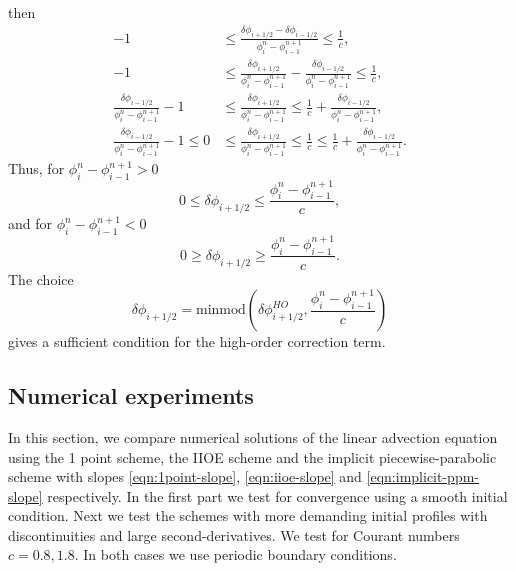 \documentclass[../thesis.tex]{subfiles}
\begin{document}
then
\begin{equation}
    \begin{split}
        -1
        &\leq
        \frac{\delta \phi_{i+1/2} - \delta \phi_{i-1/2}}
        {\phi_{i}^{n} - \phi_{i-1}^{n+1}}
        \leq
        \frac{1}{c},
        \\
        -1
        &\leq
        \frac{\delta \phi_{i+1/2}}
        {\phi_{i}^{n} - \phi_{i-1}^{n+1}}
        -\frac{\delta \phi_{i-1/2}}
        {\phi_{i}^{n} - \phi_{i-1}^{n+1}}
        \leq
        \frac{1}{c},
        \\
        \frac{\delta \phi_{i-1/2}}
        {\phi_{i}^{n} - \phi_{i-1}^{n+1}}-1
        &\leq
        \frac{\delta \phi_{i+1/2}}
        {\phi_{i}^{n} - \phi_{i-1}^{n+1}}
        \leq
        \frac{1}{c}
        +\frac{\delta \phi_{i-1/2}}
        {\phi_{i}^{n} - \phi_{i-1}^{n+1}},
        \\
        \frac{\delta \phi_{i-1/2}}
        {\phi_{i}^{n} - \phi_{i-1}^{n+1}}-1
        \leq
        0
        &\leq
        \frac{\delta \phi_{i+1/2}}
        {\phi_{i}^{n} - \phi_{i-1}^{n+1}}
        \leq
        \frac{1}{c}
        \leq
        \frac{1}{c}
        +\frac{\delta \phi_{i-1/2}}
        {\phi_{i}^{n} - \phi_{i-1}^{n+1}}.
    \end{split}
\end{equation}
Thus, for \(\phi_{i}^{n} - \phi_{i-1}^{n+1} > 0\)
\begin{equation}
    0
    \leq
    \delta \phi_{i+1/2}
    \leq
    \frac{\phi_{i}^{n} - \phi_{i-1}^{n+1}}{c},
\end{equation}
and for \(\phi_{i}^{n} - \phi_{i-1}^{n+1} < 0\)
\begin{equation}
    0
    \geq
    \delta \phi_{i+1/2}
    \geq
    \frac{\phi_{i}^{n} - \phi_{i-1}^{n+1}}{c}.
\end{equation}
The choice
\begin{equation}
    \delta \phi_{i+1/2} = \mbox{minmod}\left(
        \delta \phi_{i+1/2}^{HO},
        \frac{\phi_{i}^{n} - \phi_{i-1}^{n+1}}{c}
    \right)
\end{equation}
gives a sufficient condition for the high-order correction term.
\subsection[]{Numerical experiments}
In this section, we compare numerical solutions of the linear advection equation using the 1 point scheme, the  IIOE scheme and the implicit piecewise-parabolic scheme with slopes \eqref{eqn:1point-slope}, \eqref{eqn:iioe-slope} and \eqref{eqn:implicit-ppm-slope} respectively.
In the first part we test for convergence using a smooth initial condition. Next we test the schemes with more demanding initial profiles with discontinuities and large second-derivatives.
We test for Courant numbers \(c = 0.8, 1.8\).
In both cases we use periodic boundary conditions.
\end{document}
